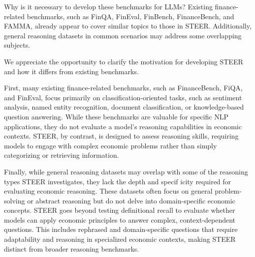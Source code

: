 \documentclass[12pt]{rebuttal_style}
\begin{document}
\begin{revcomment}
    Why is it necessary to develop these benchmarks for LLMs? Existing finance-related benchmarks, such as FinQA, FinEval, FinBench, FinanceBench, and FAMMA, already appear to cover similar topics to those in STEER. Additionally, general reasoning datasets in common scenarios may address some overlapping subjects.
\end{revcomment}
\begin{response}
    We appreciate the opportunity to clarify the motivation for developing STEER and how it differs from existing benchmarks.
    
    First, many existing finance-related benchmarks, such as FinanceBench, FiQA, and FinEval, focus primarily on classification-oriented tasks, such as sentiment analysis, named entity recognition, document classification, or knowledge-based question answering. While these benchmarks are valuable for specific NLP applications, they do not evaluate a model’s reasoning capabilities in economic contexts. STEER, by contrast, is designed to assess reasoning skills, requiring models to engage with complex economic problems rather than simply categorizing or retrieving information.
    
    Finally, while general reasoning datasets may overlap with some of the reasoning types STEER investigates, they lack the depth and specif icity required for evaluating economic reasoning. These datasets often focus on general problem-solving or abstract reasoning but do not delve into domain-specific economic concepts. STEER goes beyond testing definitional recall to evaluate whether models can apply economic principles to answer complex, context-dependent questions. This includes rephrased and domain-specific questions that require adaptability and reasoning in specialized economic contexts, making STEER distinct from broader reasoning benchmarks.
\end{response}
\end{document}
